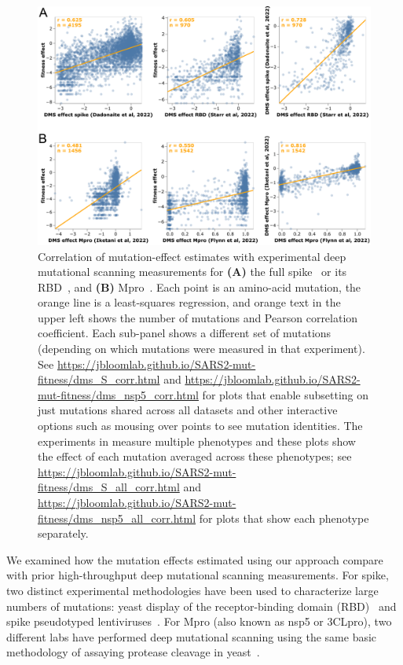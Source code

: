 \documentclass[9pt,twocolumn,twoside]{gsajnl_modified}
\begin{document}
\begin{figure}
\centering
\includegraphics[width=0.7\linewidth]{figs/dms.png}
\caption{
Correlation of mutation-effect estimates with experimental deep mutational scanning measurements for {\bf (A)} the full spike~\citep{dadonaite2022pseudovirus} or its RBD~\citep{starr2022deep}, and {\bf (B)} Mpro~\citep{flynn2022,iketani2022functional}.
Each point is an amino-acid mutation, the orange line is a least-squares regression, and orange text in the upper left shows the number of mutations and Pearson correlation coefficient.
Each sub-panel shows a different set of mutations (depending on which mutations were measured in that experiment).
See \url{https://jbloomlab.github.io/SARS2-mut-fitness/dms_S_corr.html} and \url{https://jbloomlab.github.io/SARS2-mut-fitness/dms_nsp5_corr.html} for plots that enable subsetting on just mutations shared across all datasets and other interactive options such as mousing over points to see mutation identities.
The experiments in \cite{starr2022deep, flynn2022} measure multiple phenotypes and these plots show the effect of each mutation averaged across these phenotypes; see \url{https://jbloomlab.github.io/SARS2-mut-fitness/dms_S_all_corr.html} and \url{https://jbloomlab.github.io/SARS2-mut-fitness/dms_nsp5_all_corr.html} for plots that show each phenotype separately.
\label{fig:dms}
}
\end{figure}

We examined how the mutation effects estimated using our approach compare with prior high-throughput deep mutational scanning measurements.
For spike, two distinct experimental methodologies have been used to characterize large numbers of mutations: yeast display of the receptor-binding domain (RBD)~\citep{starr2020deep,starr2022deep} and spike pseudotyped lentiviruses~\citep{dadonaite2022pseudovirus}.
For Mpro (also known as nsp5 or 3CLpro), two different labs have performed deep mutational scanning using the same basic methodology of assaying protease cleavage in yeast~\citep{flynn2022,iketani2022functional}.
\end{document}
